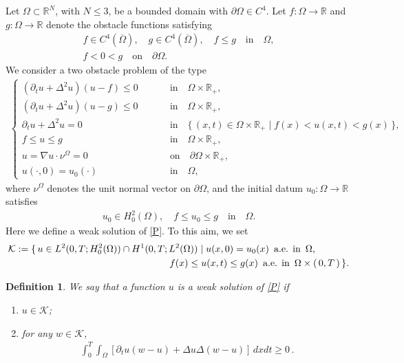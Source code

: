 \documentclass[12pt]{amsart}
\newtheorem{definition}{Definition}[section]
\begin{document}
Let $\Omega \subset {\mathbb{R}}^{N}$, with $N\le 3$, be a bounded domain with ${\partial} \Omega \in C^{4}$. 
Let $f : \Omega \to {\mathbb{R}}$ and $g : \Omega \to {\mathbb{R}}$ denote the obstacle functions satisfying 
\begin{gather}
f \in C^{4}({\overline{{\Omega}}}), \quad g \in C^4({\overline{{\Omega}}}), \quad f  \le g \quad \text{in} \quad \Omega, \label{fg-cond-1} \\
f < 0 < g \quad \text{on} \quad {\partial} \Omega.  \label{fg-cond-2}
\end{gather}
We consider a two obstacle problem of the type 
\begin{align} \label{P}
\begin{cases}
({\partial}_{t} u + \Delta^{2} u)(u-f) \le 0 \qquad \,\,\,& \text{in} \quad \Omega \times {\mathbb{R}}_{+}, \\
 ({\partial}_{t} u + \Delta^{2} u)(u-g) \le 0 \qquad \,\,\,& \text{in} \quad \Omega \times {\mathbb{R}}_{+}, \\
 {\partial}_{t} u + \Delta^{2} u = 0 \qquad \,\,\,& \text{in} \quad \{\, (x,t) \in \Omega \times {\mathbb{R}}_{+} \mid f(x) < u(x,t) < g(x) \,\}, \\
 f \le u \le g \qquad \,\, \qquad & \text{in} \quad \Omega \times {\mathbb{R}}_{+}, \\
 u = \nabla u \cdot \nu^{\Omega} = 0 \,\,\,\,\quad & \text{on} \quad {\partial} \Omega \times {\mathbb{R}}_{+}, \\
 u(\cdot,0)=u_{0}(\cdot) \qquad \,\,\,\,\, & \text{in} \quad \Omega,   
\end{cases} \tag{P}
\end{align}
where $\nu^{\Omega}$ denotes the unit normal vector on ${\partial} \Omega$,
and the initial datum $u_{0} : \Omega \to {\mathbb{R}}$ satisfies 
\begin{align} \label{i-cond}
u_{0} \in H^{2}_{0}(\Omega), \quad f \le u_{0} \le g \quad \text{in} \quad \Omega. 
\end{align}
Here we define a weak solution of \eqref{P}. To this aim, we set 
\begin{align} \label{mc-K}
{\mathcal{K}} &:= \{\, u \in L^2(0,T;H^2_0(\Omega)) \cap H^1(0,T; L^2(\Omega)) 
\mid u(x,0)= u_0(x) \,\,\,\text{a.e. in} \,\,\, \Omega, \\
& \qquad \qquad \qquad \qquad \qquad \qquad \qquad \qquad 
f(x) \le u(x,t) \le g(x) \,\,\, \text{a.e. in} \,\,\, \Omega \times (\, 0,T \,) \,\}. \notag
\end{align}
\begin{definition} \label{weak-sol}
We say that a function $u$ is a weak solution of \eqref{P} if 
\begin{enumerate}
\item[{\rm (i)}] $u \in {\mathcal{K}}${\rm ;} 
\item[{\rm (ii)}] for any $w \in {\mathcal{K}}$,  
\begin{align}
\int^T_0 \!\!\! \int_{\Omega} \left[ {\partial}_t u (w-u) + \Delta u \Delta (w-u) \right] \, dx dt \ge 0\,. 
\end{align}
\end{enumerate}
\end{definition}
\end{document}
